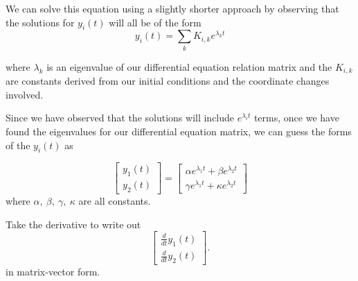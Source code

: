 \begin{enumerate}
\qitem We can solve this equation using a slightly shorter approach by observing that the solutions for $y_i(t)$ will all be of the form
$$y_i(t) = \sum_k K_{i,k} e^{\lambda_k t}$$

where $\lambda_k$ is an eigenvalue of our differential equation
relation matrix and the $K_{i,k}$ are constants derived from our
initial conditions and the coordinate changes involved. 

Since we have observed that the solutions will include
$e^{\lambda_i t}$ terms, once we have found the eigenvalues for our
differential equation matrix, we can guess the forms of the $y_i(t)$ as

 	$$\begin{bmatrix}y_1(t) \\ y_2(t)\end{bmatrix}
        = \begin{bmatrix}\alpha e^{\lambda_1t} + \beta e^{\lambda_2t}
          \\ \gamma e^{\lambda_1 t}  + \kappa e^{\lambda_2 t} \end{bmatrix}$$
where $\alpha, ~\beta, ~\gamma, ~\kappa$ are all constants.

\begin{enumerate}
	\qitem Take the derivative to write out 
	$$\begin{bmatrix}\frac{d}{dt}y_1(t) \\ \frac{d}{dt}y_2(t)\end{bmatrix}.$$ in matrix-vector form.
	
	

\end{enumerate}
\end{enumerate}

